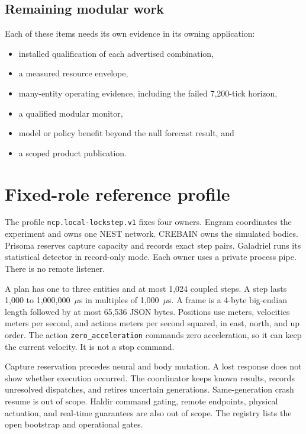 \documentclass[11pt,a4paper]{article}
\theoremstyle{definition}
\let\NcpTextttBase\texttt
\renewcommand{\texttt}[1]{\mbox{\NcpTextttBase{#1}}}
\begin{document}
\subsection{Remaining modular work}

Each of these items needs its own evidence in its owning application:
\begin{itemize}[leftmargin=*]
  \item installed qualification of each advertised combination,
  \item a measured resource envelope,
  \item many-entity operating evidence, including the failed 7,200-tick horizon,
  \item a qualified modular monitor,
  \item model or policy benefit beyond the null forecast result, and
  \item a scoped product publication.
\end{itemize}

\section{Fixed-role reference profile}


The profile \texttt{ncp.local-lockstep.v1} fixes four owners. Engram coordinates the
experiment and owns one NEST network. CREBAIN owns the simulated bodies. Prisoma
reserves capture capacity and records exact step pairs. Galadriel runs its statistical
detector in record-only mode. Each owner uses a private process pipe. There is no
remote listener.

A plan has one to three entities and at most 1,024 coupled steps. A step lasts
1,000 to 1,000,000~$\mu$s in multiples of 1,000~$\mu$s. A frame is a 4-byte big-endian
length followed by at most 65,536 JSON bytes. Positions use meters, velocities meters
per second, and actions meters per second squared, in east, north, and up order. The
action \texttt{zero\_acceleration} commands zero acceleration, so it can keep the current
velocity. It is not a stop command.

Capture reservation precedes neural and body mutation. A lost response does not show
whether execution occurred. The coordinator keeps known results, records unresolved
dispatches, and retires uncertain generations. Same-generation crash resume is out of
scope. Haldir command gating, remote endpoints, physical actuation, and real-time
guarantees are also out of scope. The registry  lists
the open bootstrap and operational gates.
\end{document}
